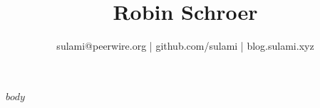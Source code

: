 \documentclass[a4paper,10pt]{scrartcl}
\title{\bfseries Robin Schroer}
\author{sulami@peerwire.org | github.com/sulami | blog.sulami.xyz}
\date{}
\begin{document}
\maketitle

$body$
\end{document}

